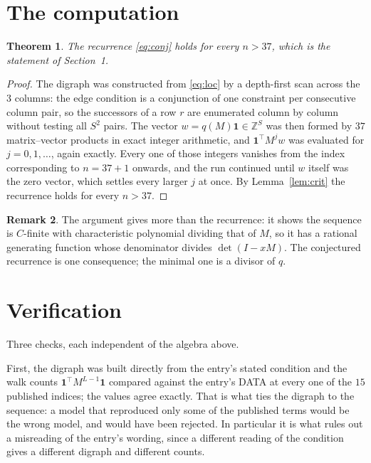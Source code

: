 \documentclass[11pt,a4paper]{article}
\theoremstyle{plain}
\newtheorem{theorem}{Theorem}
\theoremstyle{definition}
\newtheorem{remark}[theorem]{Remark}
\begin{document}
\section{The computation}

\begin{theorem}
The recurrence \eqref{eq:conj} holds for every $n>37$, which is the statement of
Section~1.
\end{theorem}

\begin{proof}
The digraph was constructed from \eqref{eq:loc} by a depth-first scan across the $3$
columns: the edge condition is a conjunction of one constraint per consecutive column
pair, so the successors of a row $r$ are enumerated column by column without testing all
$S^2$ pairs. The vector $w=q(M)\mathbf{1}\in\mathbb{Z}^{S}$ was then formed by $37$
matrix--vector products in exact integer arithmetic, and $\mathbf{1}^{\!\top}M^{j}w$ was
evaluated for $j=0,1,\dots$, again exactly. Every one of those integers vanishes from the
index corresponding to $n=37+1$ onwards, and the run continued until $w$ itself was the
zero vector, which settles every larger $j$ at once. By Lemma~\ref{lem:crit} the recurrence
holds for every $n>37$.
\end{proof}

\begin{remark}
The argument gives more than the recurrence: it shows the sequence is $C$-finite with
characteristic polynomial dividing that of $M$, so it has a rational generating function
whose denominator divides $\det(I-xM)$. The conjectured recurrence is one consequence; the
minimal one is a divisor of $q$.
\end{remark}

\section{Verification}

Three checks, each independent of the algebra above.

First, the digraph was built directly from the entry's stated condition and the walk counts
$\mathbf{1}^{\!\top}M^{L-1}\mathbf{1}$ compared against the entry's DATA at
every one of the $15$ published indices; the values agree exactly. That is what ties
the digraph to the sequence: a model that reproduced only some of the published terms would
be the wrong model, and would have been rejected. In particular it is what rules out a
misreading of the entry's wording, since a different reading of the condition gives a
different digraph and different counts.
\end{document}
